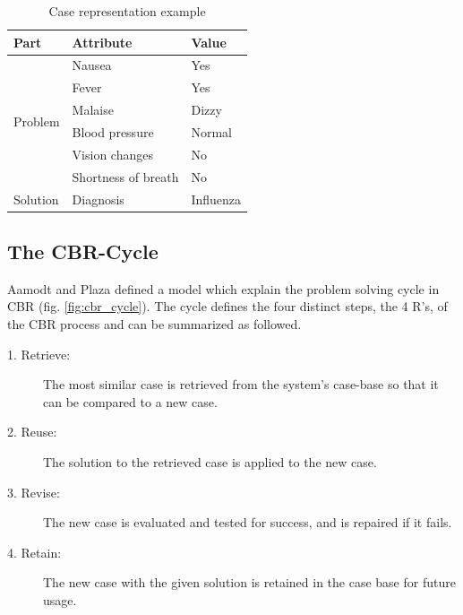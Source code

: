 \begin{table}[h]
\centering
\caption{Case representation example}
\label{tab:example_case}
\begin{tabular}{|l|l|l|}

\hline
 \textbf{Part} & \textbf{Attribute} & \textbf{Value} \\ \hline \hline
\multicolumn{1}{|l|}{\multirow{6}{*}{Problem}} & Nausea & Yes \\ \cline{2-3} 
\multicolumn{1}{|l|}{} & Fever & Yes \\ \cline{2-3} 
\multicolumn{1}{|l|}{} & Malaise & Dizzy \\ \cline{2-3} 
\multicolumn{1}{|l|}{} & Blood pressure & Normal \\ \cline{2-3} 
\multicolumn{1}{|l|}{} & Vision changes & No \\ \cline{2-3} 
\multicolumn{1}{|l|}{} & Shortness of breath & No \\ \hline
\multicolumn{1}{|l|}{Solution} & Diagnosis & Influenza \\ \hline
\end{tabular}
\end{table}

\subsection{The CBR-Cycle}\label{sec:cbr-cycle}

Aamodt and Plaza \cite{aamodt1994case} defined a model which explain the problem solving cycle in CBR (fig. \ref{fig:cbr_cycle}). The cycle defines the four distinct steps, the 4 R's, of the CBR process and can be summarized as followed.

\begin{description}
\item [1. Retrieve:] The most similar case is retrieved from the system's case-base so that it can be compared to a new case.
\item [2. Reuse:] The solution to the retrieved case is applied to the new case.
\item [3. Revise:] The new case is evaluated and tested for success, and is repaired if it fails.
\item [4. Retain:] The new case with the given solution is retained in the case base for future usage.
\end{description}

